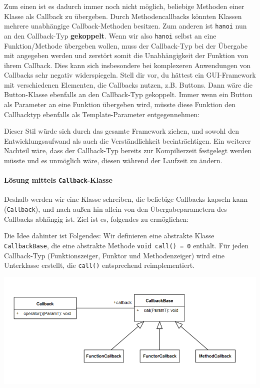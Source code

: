 Zum einen ist es dadurch immer noch nicht möglich, beliebige Methoden einer Klasse als Callback zu übergeben.
Durch Methodencallbacks könnten Klassen mehrere unabhängige Callback-Methoden besitzen.
Zum anderen ist \lstinline{hanoi} nun an den Callback-Typ \textbf{gekoppelt}.
Wenn wir also \lstinline{hanoi} selbst an eine Funktion/Methode übergeben wollen, muss der Callback-Typ bei der Übergabe mit angegeben werden und zerstört somit die Unabhängigkeit der Funktion von ihrem Callback.
Dies kann sich insbesondere bei komplexeren Anwendungen von Callbacks sehr negativ widerspiegeln.
Stell dir vor, du hättest ein GUI-Framework mit verschiedenen Elementen, die Callbacks nutzen, z.B. Buttons.
Dann wäre die Button-Klasse ebenfalls an den Callback-Typ gekoppelt.
Immer wenn ein Button als Parameter an eine Funktion übergeben wird, müsste diese Funktion den Callbacktyp ebenfalls als Template-Parameter entgegennehmen:



Dieser Stil würde sich durch das gesamte Framework ziehen, und sowohl den Entwicklungsaufwand als auch die Verständlichkeit beeinträchtigen.
Ein weiterer Nachteil wäre, dass der Callback-Typ bereits zur Kompilierzeit festgelegt werden müsste und es unmöglich wäre, diesen während der Laufzeit zu ändern.

\paragraph*{Lösung mittels \lstinline{Callback}-Klasse}

Deshalb werden wir eine Klasse schreiben, die beliebige Callbacks kapseln kann (\lstinline{Callback}), und nach außen hin allein von den Übergabeparametern des Callbacks abhängig ist.
Ziel ist es, folgendes zu ermöglichen:



Die Idee dahinter ist Folgendes:
Wir definieren eine abstrakte Klasse \lstinline{CallbackBase}, die eine abstrakte Methode \lstinline{void call() = 0} enthält.
Für jeden Callback-Typ (Funktionszeiger, Funktor und Methodenzeiger) wird eine Unterklasse erstellt, die \lstinline{call()} entsprechend reimplementiert.

\begin{center}
\includegraphics[width=.7\textwidth]{04_advanced/figures/callback_metamodel.png}
\end{center}

